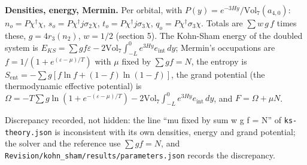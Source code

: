 \documentclass[11pt]{article}
\begin{document}
\textbf{Densities, energy, Mermin.} Per orbital, with $P(y) = e^{-3Hy}/\mathrm{Vol}_7(a_{4,0})$: $n_o = P\chi^\dagger\chi$, $s_o = P\chi^\dagger j\sigma_2\chi$, $t_o = P\chi^\dagger j\sigma_3\chi$, $q_o = P\chi^\dagger\sigma_3\chi$. Totals are $\sum w\,g\,f$ times these, $g = 4r_3(n_2)$, $w = 1/2$ (section 5). The Kohn-Sham energy of the doubled system is $E_{KS} = \sum g f\varepsilon - 2\mathrm{Vol}_7\int_{-L}^{0}e^{3Hy}e_{\mathrm{int}}\,dy$; Mermin's occupations are $f = 1/(1 + e^{(\varepsilon-\mu)/T})$ with $\mu$ fixed by $\sum g f = N$, the entropy is $S_{\mathrm{ent}} = -\sum g[f\ln f + (1-f)\ln(1-f)]$, the grand potential (the thermodynamic effective potential) is $\Omega = -T\sum g\ln(1 + e^{-(\varepsilon-\mu)/T}) - 2\mathrm{Vol}_7\int_{-L}^{0}e^{3Hy}e_{\mathrm{int}}\,dy$, and $F = \Omega + \mu N$.

Discrepancy recorded, not hidden: the line ``mu fixed by sum w g f = N'' of \texttt{ks-theor\allowbreak{}y.json} is inconsistent with its own densities, energy and grand potential; the solver and the reference use $\sum g f = N$, and \texttt{Revision\allowbreak{}/kohn\_sh\allowbreak{}am/resul\allowbreak{}ts/param\allowbreak{}eters.js\allowbreak{}on} records the discrepancy.
\end{document}
